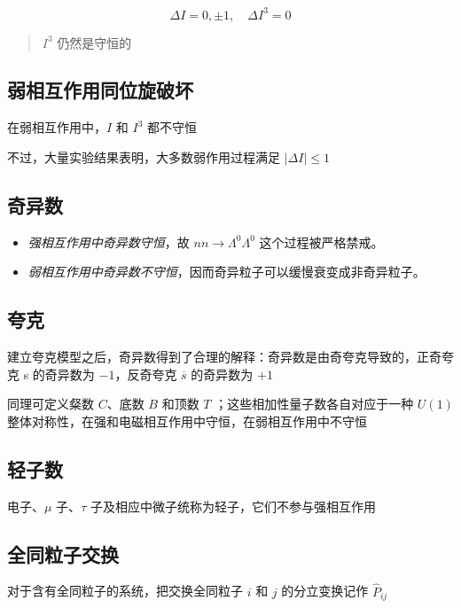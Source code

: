 \begin{equation}
    \Delta I = 0, \pm 1, \quad \Delta I^3 = 0
\end{equation}

\begin{quote}
    $I^3$ 仍然是守恒的
\end{quote}

\subsection{弱相互作用同位旋破坏}

在弱相互作用中，$I$ 和 $I^3$ 都不守恒

不过，大量实验结果表明，大多数弱作用过程满足 $|\Delta I| \le 1$

\subsection{奇异数}

\begin{itemize}
    \item \emph{强相互作用中奇异数守恒}，故 $nn \to \Lambda^0 \Lambda^0$ 这个过程被严格禁戒。
    \item \emph{弱相互作用中奇异数不守恒}，因而奇异粒子可以缓慢衰变成非奇异粒子。
\end{itemize}

\subsection{夸克}

建立夸克模型之后，奇异数得到了合理的解释：奇异数是由奇夸克导致的，正奇夸克 s 的奇异数为 $-1$，反奇夸克 $\overline{s}$ 的奇异数为 $+1$

同理可定义粲数 $C$、底数 $B$ 和顶数 $T$ ；这些相加性量子数各自对应于一种 $U(1)$
整体对称性，在强和电磁相互作用中守恒，在弱相互作用中不守恒

\subsection{轻子数}

电子、$\mu$ 子、$\tau$ 子及相应中微子统称为轻子，它们不参与强相互作用

\subsection{全同粒子交换}

对于含有全同粒子的系统，把交换全同粒子 $i$ 和 $j$ 的分立变换记作 $\hat{P}_{ij}$

